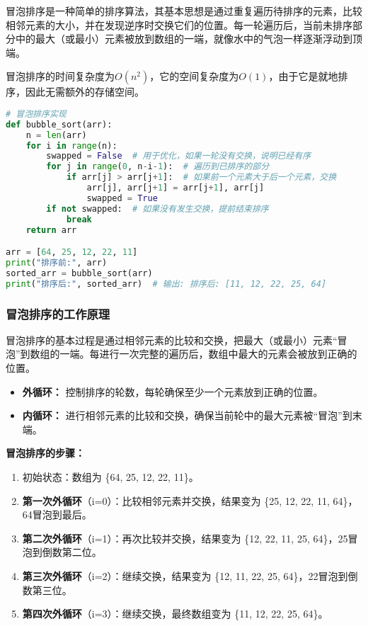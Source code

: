 \documentclass{article}
\begin{document}
冒泡排序是一种简单的排序算法，其基本思想是通过重复遍历待排序的元素，比较相邻元素的大小，并在发现逆序时交换它们的位置。每一轮遍历后，当前未排序部分中的最大（或最小）元素被放到数组的一端，就像水中的气泡一样逐渐浮动到顶端。

冒泡排序的时间复杂度为$O(n^2)$，它的空间复杂度为$O(1)$，由于它是就地排序，因此无需额外的存储空间。

\begin{lstlisting}[language=Python,caption=冒泡排序实现]
# 冒泡排序实现
def bubble_sort(arr):
    n = len(arr)
    for i in range(n):
        swapped = False  # 用于优化，如果一轮没有交换，说明已经有序
        for j in range(0, n-i-1):  # 遍历到已排序的部分
            if arr[j] > arr[j+1]:  # 如果前一个元素大于后一个元素，交换
                arr[j], arr[j+1] = arr[j+1], arr[j]
                swapped = True
        if not swapped:  # 如果没有发生交换，提前结束排序
            break
    return arr

arr = [64, 25, 12, 22, 11]
print("排序前:", arr)
sorted_arr = bubble_sort(arr)
print("排序后:", sorted_arr)  # 输出: 排序后: [11, 12, 22, 25, 64]
\end{lstlisting}

\subsubsection{冒泡排序的工作原理}
冒泡排序的基本过程是通过相邻元素的比较和交换，把最大（或最小）元素“冒泡”到数组的一端。每进行一次完整的遍历后，数组中最大的元素会被放到正确的位置。

\begin{itemize}
    \item \textbf{外循环：} 控制排序的轮数，每轮确保至少一个元素放到正确的位置。
    \item \textbf{内循环：} 进行相邻元素的比较和交换，确保当前轮中的最大元素被“冒泡”到末端。
\end{itemize}

\noindent
\textbf{冒泡排序的步骤：}
\begin{enumerate}
    \item 初始状态：数组为 \{64, 25, 12, 22, 11\}。
    \item \textbf{第一次外循环}（i=0）：比较相邻元素并交换，结果变为 \{25, 12, 22, 11, 64\}，64冒泡到最后。
    \item \textbf{第二次外循环}（i=1）：再次比较并交换，结果变为 \{12, 22, 11, 25, 64\}，25冒泡到倒数第二位。
    \item \textbf{第三次外循环}（i=2）：继续交换，结果变为 \{12, 11, 22, 25, 64\}，22冒泡到倒数第三位。
    \item \textbf{第四次外循环}（i=3）：继续交换，最终数组变为 \{11, 12, 22, 25, 64\}。
\end{enumerate}
\end{document}
